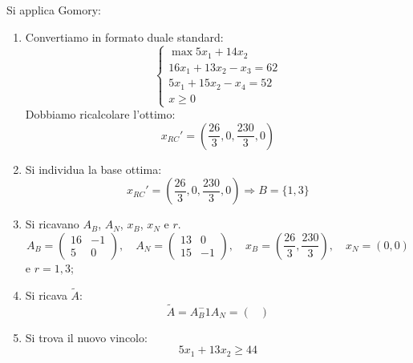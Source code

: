 \documentclass[a4paper,11pt]{article}
\begin{document}
Si applica Gomory:
\begin{enumerate}
	\item Convertiamo in formato duale standard: 
\[
	\begin{cases}	
		\max 5 x_1 + 14 x_2 \\ 
		16 x_1 + 13 x_2 - x_3 = 62 \\ 
		5 x_1 + 15 x_2 - x_4 = 52 \\ 
		x \geq 0 
	\end{cases}
\]
Dobbiamo ricalcolare l'ottimo:
$$ 
x_{RC}' = \left( \frac{26}{3}, 0, \frac{230}{3}, 0 \right)
$$
\item Si individua la base ottima:
$$
x_{RC}' = \left( \frac{26}{3}, 0, \frac{230}{3}, 0 \right) \Rightarrow B = \{1, 3 \}
$$
\item Si ricavano $A_B$, $A_N$, $x_B$, $x_N$ e $r$.
	$$
	A_B = 
	\begin{pmatrix}
		16 & -1  \\ 
		5 & 0 
	\end{pmatrix}, \quad 
	A_N = 
	\begin{pmatrix}
		13 & 0 \\ 
		15 & -1
	\end{pmatrix}, \quad
	x_B =
	\left(
		\frac{26}{3}, \frac{230}{3}
	\right), \quad 
	x_N = 
	\left(
		0, 0
	\right)
	$$
	e $r=1,3$;
\item Si ricava $\tilde{A}$:
	$$
	\tilde{A} = A_B^-1 A_N = \begin{pmatrix}
	\end{pmatrix} 
	$$
\item Si trova il nuovo vincolo:
	$$5 x_1 + 13 x_2 \geq 44$$ 
\end{enumerate}
\end{document}
